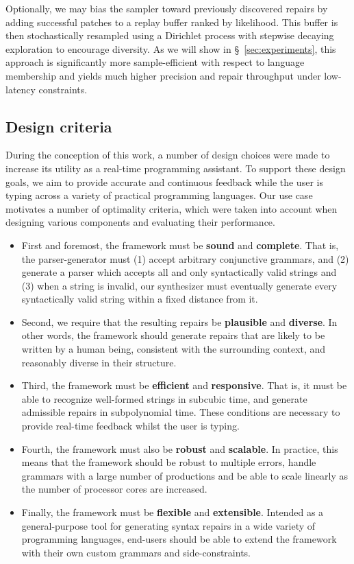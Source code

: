 \documentclass[sigplan,review,anonymous,acmsmall]{acmart}\settopmatter{printfolios=false,printccs=false,printacmref=false}
\begin{document}
Optionally, we may bias the sampler toward previously discovered repairs by adding successful patches to a replay buffer ranked by likelihood. This buffer is then stochastically resampled using a Dirichlet process with stepwise decaying exploration to encourage diversity. As we will show in \S~\ref{sec:experiments}, this approach is significantly more sample-efficient with respect to language membership and yields much higher precision and repair throughput under low-latency constraints.

\subsection{Design criteria}

During the conception of this work, a number of design choices were made to increase its utility as a real-time programming assistant. To support these design goals, we aim to provide accurate and continuous feedback while the user is typing across a variety of practical programming languages. Our use case motivates a number of optimality criteria, which were taken into account when designing various components and evaluating their performance.

\begin{itemize}
  \item First and foremost, the framework must be \textbf{sound} and \textbf{complete}. That is, the parser-generator must (1) accept arbitrary conjunctive grammars, and (2) generate a parser which accepts all and only syntactically valid strings and (3) when a string is invalid, our synthesizer must eventually generate every syntactically valid string within a fixed distance from it.
  \item Second, we require that the resulting repairs be \textbf{plausible} and \textbf{diverse}. In other words, the framework should generate repairs that are likely to be written by a human being, consistent with the surrounding context, and reasonably diverse in their structure.
  \item Third, the framework must be \textbf{efficient} and \textbf{responsive}. That is, it must be able to recognize well-formed strings in subcubic time, and generate admissible repairs in subpolynomial time. These conditions are necessary to provide real-time feedback whilst the user is typing.
  \item Fourth, the framework must also be \textbf{robust} and \textbf{scalable}. In practice, this means that the framework should be robust to multiple errors, handle grammars with a large number of productions and be able to scale linearly as the number of processor cores are increased.
  \item Finally, the framework must be \textbf{flexible} and \textbf{extensible}. Intended as a general-purpose tool for generating syntax repairs in a wide variety of programming languages, end-users should be able to extend the framework with their own custom grammars and side-constraints.
\end{itemize}
\end{document}
